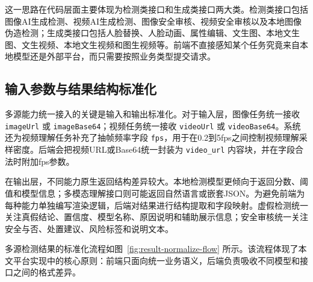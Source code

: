 这一思路在代码层面主要体现为检测类接口和生成类接口两大类。检测类接口包括图像AI生成检测、视频AI生成检测、图像安全审核、视频安全审核以及本地图像伪造检测；生成类接口包括人脸替换、人脸动画、属性编辑、文生图、本地文生图、文生视频、本地文生视频和图生视频等。前端不直接感知某个任务究竟来自本地模型还是外部平台，而只需要按照业务类型提交请求。

\subsection{输入参数与结果结构标准化}

多源能力统一接入的关键是输入和输出标准化。对于输入层，图像任务统一接收 \texttt{imageUrl} 或 \texttt{imageBase64}；视频任务统一接收 \texttt{videoUrl} 或 \texttt{videoBase64}。系统还为视频理解任务补充了抽帧频率字段 \texttt{fps}，用于在0.2到5fps之间控制视频理解采样密度。后端会把视频URL或Base64统一封装为 \texttt{video\_url} 内容块，并在字段合法时附加fps参数。

在输出层，不同能力原生返回结构差异较大。本地检测模型更倾向于返回分数、阈值和模型信息；多模态理解接口则可能返回自然语言或嵌套JSON。为避免前端为每种能力单独编写渲染逻辑，后端对结果进行结构提取和字段映射。虚假检测统一关注真假结论、置信度、模型名称、原因说明和辅助展示信息；安全审核统一关注安全与否、处置建议、风险标签和说明文本。

多源检测结果的标准化流程如图~\ref{fig:result-normalize-flow} 所示。该流程体现了本文平台实现中的核心原则：前端只面向统一业务语义，后端负责吸收不同模型和接口之间的格式差异。

